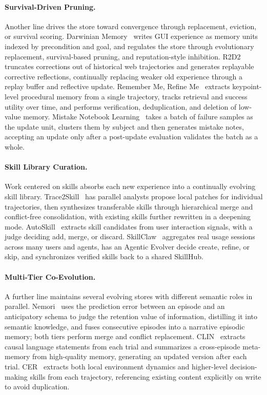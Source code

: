 \paragraph{Survival-Driven Pruning.} Another line drives the store toward convergence through replacement, eviction, or survival scoring. Darwinian Memory~\cite{Mi26b} writes GUI experience as memory units indexed by precondition and goal, and regulates the store through evolutionary replacement, survival-based pruning, and reputation-style inhibition. R2D2~\cite{Hua25e} truncates corrections out of historical web trajectories and generates replayable corrective reflections, continually replacing weaker old experience through a replay buffer and reflective update. Remember Me, Refine Me~\cite{Cao25} extracts keypoint-level procedural memory from a single trajectory, tracks retrieval and success utility over time, and performs verification, deduplication, and deletion of low-value memory. Mistake Notebook Learning~\cite{Su25} takes a batch of failure samples as the update unit, clusters them by subject and then generates mistake notes, accepting an update only after a post-update evaluation validates the batch as a whole.

\paragraph{Skill Library Curation.} Work centered on skills absorbs each new experience into a continually evolving skill library. Trace2Skill~\cite{Ni26} has parallel analysts propose local patches for individual trajectories, then synthesizes transferable skills through hierarchical merge and conflict-free consolidation, with existing skills further rewritten in a deepening mode. AutoSkill~\cite{Yan26} extracts skill candidates from user interaction signals, with a judge deciding add, merge, or discard. SkillClaw~\cite{Ma26b} aggregates real usage sessions across many users and agents, has an Agentic Evolver decide create, refine, or skip, and synchronizes verified skills back to a shared SkillHub.

\paragraph{Multi-Tier Co-Evolution.} A further line maintains several evolving stores with different semantic roles in parallel. Nemori~\cite{Ma25} uses the prediction error between an episode and an anticipatory schema to judge the retention value of information, distilling it into semantic knowledge, and fuses consecutive episodes into a narrative episodic memory; both tiers perform merge and conflict replacement. CLIN~\cite{Maj23} extracts causal language statements from each trial and summarizes a cross-episode meta-memory from high-quality memory, generating an updated version after each trial. CER~\cite{Liu25} extracts both local environment dynamics and higher-level decision-making skills from each trajectory, referencing existing content explicitly on write to avoid duplication.

